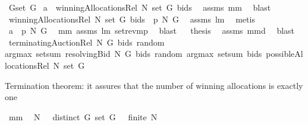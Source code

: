 \begin{isabellebody}
\ {\isacharquery}G{\isacharequal}{\isachardoublequoteopen}set\ G{\isachardoublequoteclose}\isanewline
{}\isamarkupfalse%
\ {\isachardoublequoteopen}{\isacharquery}a\ {\isasymin}\ winningAllocationsRel\ N\ {\isacharparenleft}set\ G{\isacharparenright}\ bids{\isachardoublequoteclose}\ \isamarkupfalse%
\ assms\ mm{}{}\ \isamarkupfalse%
\ blast\isanewline
{}\isamarkupfalse%
\ \isamarkupfalse%
\ {\isachardoublequoteopen}winningAllocationsRel\ N\ {\isacharparenleft}set\ G{\isacharparenright}\ bids\ {\isasymsubseteq}\ {\isacharquery}p\ N\ {\isacharquery}G{\isachardoublequoteclose}\ \isamarkupfalse%
\ assms\ lm{}{}\ \isamarkupfalse%
\ metis\isanewline
{}\isamarkupfalse%
\ \isamarkupfalse%
\ {\isachardoublequoteopen}{\isacharquery}a\ {\isasymin}\ {\isacharquery}p\ N\ {\isacharquery}G{\isachardoublequoteclose}\ \isamarkupfalse%
\ mm{}{}\ assms\ lm{}{}\ set{\isacharunderscore}rev{\isacharunderscore}mp\ \isamarkupfalse%
\ blast\isanewline
{}\isamarkupfalse%
\ \isamarkupfalse%
\ {\isacharquery}thesis\ \isamarkupfalse%
\ assms\ mm{}{}d\ \isamarkupfalse%
\ blast\ \isanewline
{}\isamarkupfalse%
%
\endisatagproof
{\isafoldproof}%
%
\isadelimproof
\isanewline
%
\endisadelimproof
\isanewline
{}\isamarkupfalse%
\ {\isachardoublequoteopen}terminatingAuctionRel\ N\ G\ bids\ random\ {\isacharequal}{\isacharequal}\ \isanewline
argmax\ {\isacharparenleft}setsum\ {\isacharparenleft}resolvingBid{\isacharprime}\ N\ G\ bids\ random{\isacharparenright}{\isacharparenright}\ {\isacharparenleft}argmax\ {\isacharparenleft}setsum\ bids{\isacharparenright}\ {\isacharparenleft}possibleAllocationsRel\ N\ {\isacharparenleft}set\ G{\isacharparenright}{\isacharparenright}{\isacharparenright}{\isachardoublequoteclose}%
\begin{isamarkuptext}%
Termination theorem: it assures that the number of winning allocations is exactly one%
\end{isamarkuptext}%
\isamarkuptrue%
\isamarkupfalse%
\ mm{}{}{\isacharcolon}\ \ \isanewline
{\isachardoublequoteopen}N\ {\isasymnoteq}\ {\isacharbraceleft}{\isacharbraceright}{\isachardoublequoteclose}\ {\isachardoublequoteopen}distinct\ G{\isachardoublequoteclose}\ {\isachardoublequoteopen}set\ G\ {\isasymnoteq}\ {\isacharbraceleft}{\isacharbraceright}{\isachardoublequoteclose}\ {\isachardoublequoteopen}finite\ N{\isachardoublequoteclose}\ \ \isanewline

\end{isabellebody}
